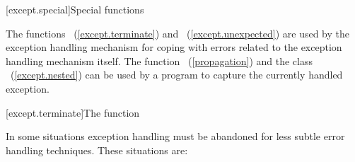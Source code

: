 [except.special]{Special functions}

\pnum
The functions ~(\ref{except.terminate}) and
~(\ref{except.unexpected}) are used by the exception
handling mechanism for coping with errors related to the exception handling
mechanism itself. The function
~(\ref{propagation}) and the class
~(\ref{except.nested}) can be used by a program to
capture the currently handled exception.

[except.terminate]{The  function}

\pnum
{}%
In some situations exception handling must be abandoned
for less subtle error handling techniques. \enternote These situations are:

